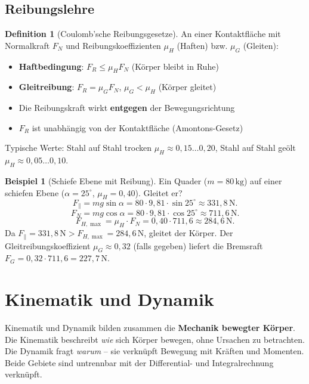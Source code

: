 ﻿\documentclass[a4paper,12pt]{report}
\theoremstyle{definition}
\newtheorem{definition}{Definition}
\newtheorem{beispiel}{Beispiel}
\begin{document}
\section{Reibungslehre}

\begin{definition}[Coulomb'sche Reibungsgesetze]
An einer Kontaktfl\"ache mit Normalkraft $F_N$ und Reibungskoeffizienten
$\mu_H$ (Haften) bzw. $\mu_G$ (Gleiten):
\begin{itemize}
    \item[-] \textbf{Haftbedingung}: $F_R \le \mu_H F_N$ (K\"orper bleibt in Ruhe)
    \item[-] \textbf{Gleitreibung}: $F_R = \mu_G F_N$, $\mu_G < \mu_H$ (K\"orper gleitet)
    \item[-] Die Reibungskraft wirkt \textbf{entgegen} der Bewegungsrichtung
    \item[-] $F_R$ ist unabh\"angig von der Kontaktfl\"ache (Amontons-Gesetz)
\end{itemize}
Typische Werte: Stahl auf Stahl trocken $\mu_H \approx 0{,}15\ldots0{,}20$,
Stahl auf Stahl ge\"olt $\mu_H \approx 0{,}05\ldots0{,}10$.
\end{definition}

\begin{beispiel}[Schiefe Ebene mit Reibung]
Ein Quader ($m = 80\,\mathrm{kg}$) auf einer schiefen Ebene
($\alpha = 25^\circ$, $\mu_H = 0{,}40$). Gleitet er?
\[
  F_{\parallel} = mg\sin\alpha = 80\cdot9{,}81\cdot\sin25^\circ \approx 331{,}8\,\mathrm{N}.
\]
\[
  F_{N} = mg\cos\alpha = 80\cdot9{,}81\cdot\cos25^\circ \approx 711{,}6\,\mathrm{N}.
\]
\[
  F_{H,\max} = \mu_H\cdot F_N = 0{,}40\cdot711{,}6 \approx 284{,}6\,\mathrm{N}.
\]
Da $F_{\parallel} = 331{,}8\,\mathrm{N} > F_{H,\max} = 284{,}6\,\mathrm{N}$, gleitet der K\"orper.
Der Gleitreibungskoeffizient $\mu_G \approx 0{,}32$ (falls gegeben)
liefert die Bremsraft $F_G = 0{,}32\cdot711{,}6 = 227{,}7\,\mathrm{N}$.
\end{beispiel}

\chapter{Kinematik und Dynamik}

Kinematik und Dynamik bilden zusammen die \textbf{Mechanik bewegter K\"orper}.
Die Kinematik beschreibt \emph{wie} sich K\"orper bewegen, ohne Ursachen
zu betrachten. Die Dynamik fragt \emph{warum} -- sie verkn\"upft Bewegung
mit Kr\"aften und Momenten. Beide Gebiete sind untrennbar mit der
Differential- und Integralrechnung verkn\"upft.
\end{document}
